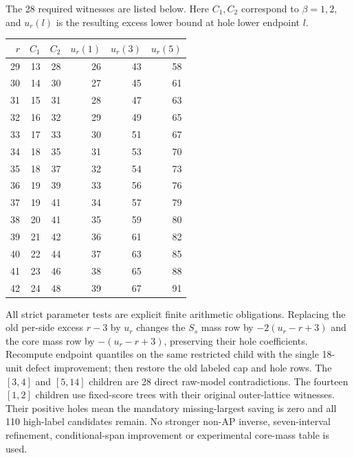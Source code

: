 \documentclass[11pt,a4paper]{article}
\theoremstyle{remark}
\begin{document}
The 28 required witnesses are listed below. Here $C_1,C_2$ correspond
to $\beta=1,2$, and $u_r(l)$ is the resulting excess lower bound at
hole lower endpoint $l$.
\begin{center}\small
\begin{tabular}{rrrrrr}
\toprule
$r$&$C_1$&$C_2$&$u_r(1)$&$u_r(3)$&$u_r(5)$\\\midrule
29&13&28&26&43&58\\
30&14&30&27&45&61\\
31&15&31&28&47&63\\
32&16&32&29&49&65\\
33&17&33&30&51&67\\
34&18&35&31&53&70\\
35&18&37&32&54&73\\
36&19&39&33&56&76\\
37&19&41&34&57&79\\
38&20&41&35&59&80\\
39&21&42&36&61&82\\
40&22&44&37&63&85\\
41&23&46&38&65&88\\
42&24&48&39&67&91\\
\bottomrule
\end{tabular}
\end{center}
All strict parameter tests are explicit finite arithmetic obligations. Replacing the old per-side excess $r-3$ by $u_r$
changes the $S_s$ mass row by $-2(u_r-r+3)$ and the core mass row
by $-(u_r-r+3)$, preserving their hole coefficients. Recompute endpoint
quantiles on the same restricted child with the single 18-unit defect
improvement; then restore the old labeled cap and hole rows.
The $[3,4]$ and $[5,14]$ children are 28 direct raw-model contradictions.
The fourteen $[1,2]$ children use fixed-score trees with their original
outer-lattice witnesses. Their positive holes mean the mandatory
missing-largest saving is zero and all 110 high-label candidates remain.
No stronger non-AP inverse, seven-interval refinement, conditional-span
improvement or experimental core-mass table is used.
\end{document}
